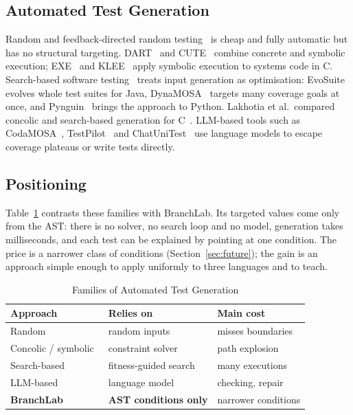 \documentclass[conference]{IEEEtran}
\begin{document}
\subsection{Automated Test Generation}
Random and feedback-directed random testing~\cite{pacheco2007randoop,arcuri2011art} is cheap and fully automatic
but has no structural targeting. DART~\cite{godefroid2005dart} and CUTE~\cite{sen2005cute} combine concrete and
symbolic execution; EXE~\cite{cadar2006exe} and KLEE~\cite{cadar2008klee} apply symbolic execution to systems
code in C. Search-based software testing~\cite{korel1990automated,mcminn2004search} treats input generation as
optimisation: EvoSuite~\cite{fraser2011whole} evolves whole test suites for Java,
DynaMOSA~\cite{panichella2018dynamosa} targets many coverage goals at once, and
Pynguin~\cite{lukasczyk2022pynguin} brings the approach to Python. Lakhotia et al.\ compared concolic and
search-based generation for C~\cite{lakhotia2010cute}. LLM-based tools such as
CodaMOSA~\cite{lemieux2023codamosa}, TestPilot~\cite{schafer2024testpilot} and
ChatUniTest~\cite{chen2024chatunitest} use language models to escape coverage plateaus or write tests directly.

\subsection{Positioning}
Table~\ref{tab:families} contrasts these families with BranchLab. Its targeted values come only from the AST:
there is no solver, no search loop and no model, generation takes milliseconds, and each test can be explained
by pointing at one condition. The price is a narrower class of conditions (Section~\ref{sec:future}); the gain
is an approach simple enough to apply uniformly to three languages and to teach.

\begin{table}[t]
\caption{Families of Automated Test Generation}\label{tab:families}
\centering\footnotesize
\begin{tabular}{@{}lll@{}}
\toprule
Approach & Relies on & Main cost \\
\midrule
Random~\cite{pacheco2007randoop,arcuri2011art} & random inputs & misses boundaries \\
Concolic / symbolic~\cite{godefroid2005dart,cadar2008klee} & constraint solver & path explosion \\
Search-based~\cite{fraser2011whole,panichella2018dynamosa} & fitness-guided search & many executions \\
LLM-based~\cite{lemieux2023codamosa,schafer2024testpilot} & language model & checking, repair \\
\textbf{BranchLab} & \textbf{AST conditions only} & narrower conditions \\
\bottomrule
\end{tabular}
\end{table}
\end{document}
